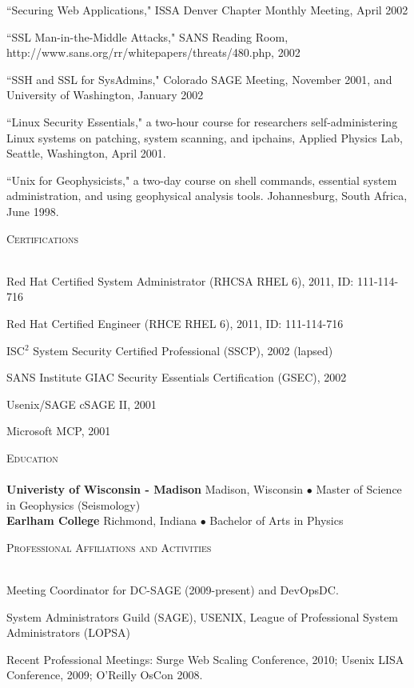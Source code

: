 \documentclass{article}
\newcommand{\lineunder}{\vspace*{-8pt} \\ \hspace*{-18pt} \hrulefill \\}
\newcommand{\header}[1]{{\hspace*{-15pt}\vspace*{6pt} \textsc{#1}} \vspace*{-6pt} \lineunder}
\newenvironment{achievements}{\begin{list}{\topsep 0pt \itemsep -2pt}} {\vspace*{4pt}\end{list}}
\newcommand{\school}[3]{
 \textbf{#1} #2 $\bullet$ #3\\ 
}
\begin{document}
\begin{achievements}
\item ``Securing Web Applications," ISSA Denver Chapter Monthly Meeting, April 2002
\item ``SSL Man-in-the-Middle Attacks," SANS Reading Room, http://www.sans.org/rr/whitepapers/threats/480.php, 2002
\item ``SSH and SSL for SysAdmins," Colorado SAGE Meeting, November 2001, and University of Washington, January 2002
\item ``Linux Security Essentials," a two-hour course for researchers self-administering Linux systems on patching, system scanning, and ipchains,  Applied Physics Lab, Seattle, Washington, April 2001.
\item ``Unix for Geophysicists," a two-day course on shell commands, essential system administration, and using geophysical analysis tools.  Johannesburg, South Africa, June 1998.
\end{achievements}


\header{Certifications}
\begin{achievements}
\item Red Hat Certified System Administrator (RHCSA RHEL 6), 2011, ID: 111-114-716
\item Red Hat Certified Engineer (RHCE RHEL 6), 2011, ID: 111-114-716
\item ISC$^{2}$ System Security Certified Professional (SSCP), 2002 (lapsed)
\item SANS Institute GIAC Security Essentials Certification (GSEC), 2002
\item Usenix/SAGE cSAGE II, 2001
\item Microsoft MCP, 2001
\end{achievements}

\header{Education}

\school{Univeristy of Wisconsin - Madison}{Madison, Wisconsin} {Master of Science in Geophysics (Seismology)}
\school{Earlham College}{Richmond, Indiana}{Bachelor of Arts in Physics}
\vspace{18pt}

\header{Professional Affiliations and Activities}
\begin{achievements}
\item Meeting Coordinator for DC-SAGE (2009-present) and DevOpsDC.
\item System Administrators Guild (SAGE), USENIX, League of Professional System Administrators (LOPSA) 
\item Recent Professional Meetings: Surge Web Scaling Conference, 2010; Usenix LISA Conference, 2009; O'Reilly OsCon 2008.
\end{achievements}
\end{document}
